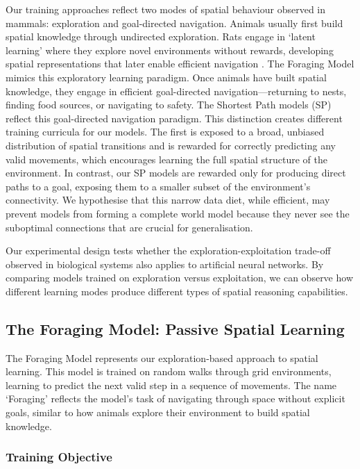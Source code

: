 Our training approaches reflect two modes of spatial behaviour observed in mammals: exploration and goal-directed navigation. Animals usually first build spatial knowledge through undirected exploration. Rats engage in `latent learning' where they explore novel environments without rewards, developing spatial representations that later enable efficient navigation \citep{okeefe1978hippocampus, whittington2022howtobuild}. The Foraging Model mimics this exploratory learning paradigm. Once animals have built spatial knowledge, they engage in efficient goal-directed navigation—returning to nests, finding food sources, or navigating to safety. The Shortest Path models (SP) reflect this goal-directed navigation paradigm. This distinction creates different training curricula for our models. The first is exposed to a broad, unbiased distribution of spatial transitions and is rewarded for correctly predicting any valid movements, which encourages learning the full spatial structure of the environment. In contrast, our SP models are rewarded only for producing direct paths to a goal, exposing them to a smaller subset of the environment’s connectivity. We hypothesise that this narrow data diet, while efficient, may prevent models from forming a complete world model because they never see the suboptimal connections that are crucial for generalisation. 

Our experimental design tests whether the exploration-exploitation trade-off observed in biological systems also applies to artificial neural networks. By comparing models trained on exploration versus exploitation, we can observe how different learning modes produce different types of spatial reasoning capabilities.

\subsection{The Foraging Model: Passive Spatial Learning}

The Foraging Model represents our exploration-based approach to spatial learning. This model is trained on random walks through grid environments, learning to predict the next valid step in a sequence of movements. The name `Foraging' reflects the model's task of navigating through space without explicit goals, similar to how animals explore their environment to build spatial knowledge.

\subsubsection*{Training Objective}

